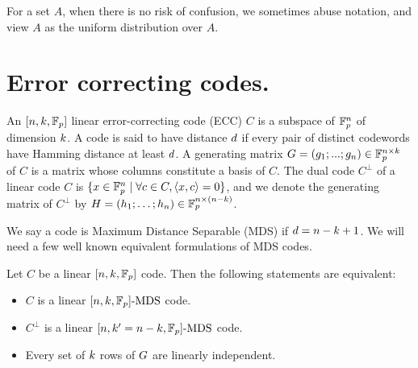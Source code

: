 For a set $A$, when there is no risk of confusion, we sometimes abuse notation, and view $A$ as the uniform distribution over $A$.



\section{Error correcting codes.} 
An $[n,k,\mathbb{F}_p]$ linear error-correcting code (ECC) $C$ is a subspace of $\mathbb{F}^n_p$ of dimension $k$. 
A code is said to have distance $d$ if every pair of distinct codewords have Hamming distance at least $d$. A generating matrix $G = (g_1;...;g_n) \in\mathbb{F}^{n\times k}_p$ of $C$ is a matrix whose columns constitute a basis of $C$. The dual code $C^\bot$ of a linear code $C$ is $\{x\in \mathbb{F}^n_p \;|\; \forall c \in C,\langle x,c\rangle = 0\}$, and we denote the generating matrix of $C^\bot$ by $H=(h_1;\ldots;h_n)\in \mathbb{F}^{n\times (n-k)}_p$.

We say a code is Maximum Distance Separable (MDS) if $d=n-k+1$. %
We will need a few well known equivalent formulations of MDS codes.
\begin{claim}
Let $C$ be a linear $[n,k,\mathbb{F}_p]$ code. Then the following statements are equivalent:
\begin{itemize}
    \item $C$ is a linear $[n,k,\mathbb{F}_p]\text{-MDS}$ code.
    \item $C^\bot$ is a linear $[n,k'=n-k,\mathbb{F}_p]\text{-MDS}$ code.
    \item Every set of $k$ rows of $G$ are linearly independent.
\end{itemize}
\end{claim}

\noindent 


